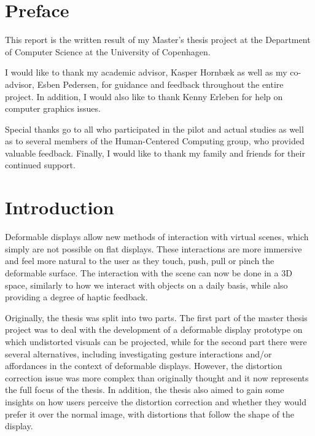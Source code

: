 \documentclass[]{article}
\begin{document}
\newpage
\listoffigures
\newpage
\listoftables 



\newpage
\thispagestyle{empty}
\renewcommand{\thepage}{\arabic{page}}%
\setcounter{page}{1}
\section*{Preface}
This report is the written result of my Master's thesis project at the Department of Computer Science at the University of Copenhagen. 

I would like to thank my academic advisor, Kasper Hornb\ae k as well as my co-advisor, Esben Pedersen, for guidance and feedback throughout the entire project. In addition, I would also like to thank Kenny Erleben for help on computer graphics issues.

Special thanks go to all who participated in the pilot and actual studies as well as to several members of the Human-Centered Computing group, who provided valuable feedback. Finally, I would like to thank my family and friends for their continued support.

\newpage
\section{Introduction}

Deformable displays allow new methods of interaction with virtual scenes, which simply are not possible on flat displays. These interactions are more immersive and feel more natural to the user as they touch, push, pull or pinch the deformable surface. The interaction with the scene can now be done in a 3D space, similarly to how we interact with objects on a daily basis, while also providing a degree of haptic feedback.

Originally, the thesis was split into two parts. The first part of the master thesis project was to deal with the development of a deformable display prototype on which undistorted visuals can be projected, while for the second part there were several alternatives, including investigating gesture interactions and/or affordances in the context of deformable displays. However, the distortion correction issue was more complex than originally thought and it now represents the full focus of the thesis. In addition, the thesis also aimed to gain some insights on how users perceive the distortion correction and whether they would prefer it over the normal image, with distortions that follow the shape of the display.
\end{document}
